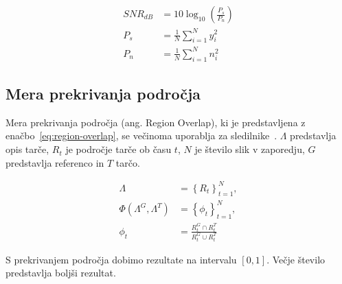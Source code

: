 \begin{subequations}
\begin{align}
SNR_{dB} &= 10 \log_{10}\left(\frac{P_s}{P_n}\right) \\
P_s &= \frac{1}{N} \sum_{i=1}^{N} y_i^2 \\
P_n &= \frac{1}{N} \sum_{i=1}^{N} n_i^2
\end{align}
\label{eq:snr}
\end{subequations}



\subsection{Mera prekrivanja področja}
Mera prekrivanja področja (ang. Region Overlap), ki je predstavljena z enačbo~\ref{eq:region-overlap}, se večinoma uporablja za sledilnike~\cite{vcehovin2016visual}. $\Lambda$ predstavlja opis tarče, $R_t$ je področje tarče ob času $t$, $N$ je število slik v zaporedju, $G$ predstavlja referenco in $T$ tarčo.

\begin{subequations}
\begin{align}
	\Lambda &= \left\{R_t\right\}^N_{t=1}, \nonumber \\
	\Phi(\Lambda^G, \Lambda^T) &= \left\{\phi_t\right\}^N_{t=1}, \nonumber \\
    \phi_t &= \frac{R_t^G \cap R_t^T }{R_t^G \cup R_t^T} 
\end{align}
\label{eq:region-overlap}
\end{subequations}


S prekrivanjem področja dobimo rezultate na intervalu $\left[0,1\right]$. Večje število predstavlja boljši rezultat.



